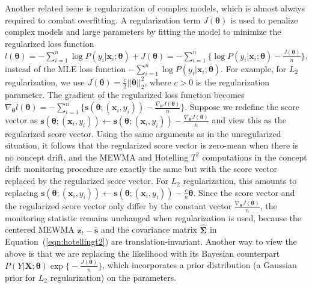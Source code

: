 \documentclass[twoside,11pt]{article}
\begin{document}
Another related issue is regularization of complex models, which is almost always required to combat overfitting. A regularization term $J(\bm{\theta})$ is used to penalize complex models and large parameters by fitting the model to minimize the regularized loss function $l(\bm{\theta}) = -\sum_{i=1}^n \log P(y_i|\bm{x}_i;\bm{\theta}) + J(\bm{\theta}) = - \sum_{i=1}^n \big\{ \log P(y_i|\bm{x}_i;\bm{\theta}) - \frac{J(\bm{\theta})}{n}\big\}$, instead of the MLE loss function $-\sum_{i=1}^n \log P(y_i|\bm{x}_i;\bm{\theta})$. For example, for $L_2$ regularization, we use $J(\bm{\theta}) = \frac{c}{2}||\bm{\theta}||_2^2$, where $c>0$ is the regularization parameter. The gradient of the regularized loss function becomes $\nabla_{\bm{\theta}}l(\bm{\theta}) = - \sum_{i=1}^n \big\{ \bm{s}(\bm{\theta};(\bm{x}_i,y_i))-\frac{\nabla_{\bm{\theta}}J(\bm{\theta})}{n} \big\}$. Suppose we redefine the score vector as $\bm{s}(\bm{\theta};(\bm{x}_i,y_i)) \leftarrow \bm{s}(\bm{\theta};(\bm{x}_i,y_i)) -\frac{\nabla_{\bm{\theta}}J(\bm{\theta})}{n}$ and view this as the regularized score vector. Using the same arguments as in the unregularized situation, it follows that the regularized score vector is zero-mean when there is no concept drift, and the MEWMA and Hotelling $T^2$ computations in the concept drift monitoring procedure are exactly the same but with the score vector replaced by the regularized score vector. For $L_2$ regularization, this amounts to replacing $\bm{s}(\bm{\theta};(\bm{x}_i,y_i)) \leftarrow \bm{s}(\bm{\theta};(\bm{x}_i,y_i)) - \frac{c}{n}\bm{\theta}$. Since the score vector and the regularized score vector only differ by the constant vector $\frac{\nabla_{\bm{\theta}}J(\bm{\theta})}{n}$, the monitoring statistic remains unchanged when regularization is used, because the centered MEWMA $\bm {z}_t-\bar { \bm {s}}$ and the covariance matrix $\hat {\mathbf{\Sigma}}$ in Equation~(\ref{eqn:hotellingt2}) are translation-invariant. Another way to view the above is that we are replacing the likelihood with its Bayesian counterpart $P(Y|\bm{X};\bm{\theta})\exp\big\{-\frac{J(\bm{\theta})}{n}\big\}$, which incorporates a prior distribution (a Gaussian prior for $L_2$ regularization) on the parameters.
\end{document}

